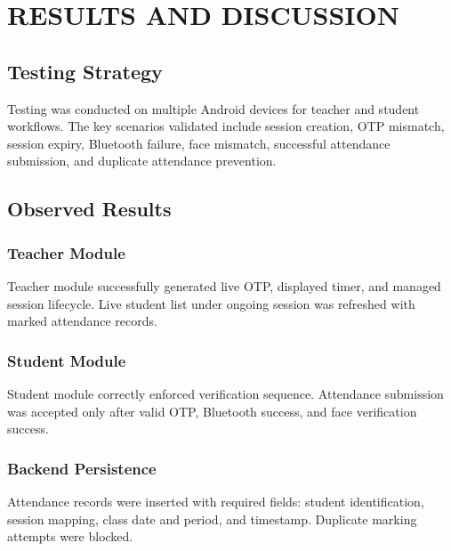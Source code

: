 \chapter{RESULTS AND DISCUSSION} \label{c6}
\section{Testing Strategy}
Testing was conducted on multiple Android devices for teacher and student workflows. The key scenarios validated include session creation, OTP mismatch, session expiry, Bluetooth failure, face mismatch, successful attendance submission, and duplicate attendance prevention.

\section{Observed Results}
\subsection{Teacher Module}
Teacher module successfully generated live OTP, displayed timer, and managed session lifecycle. Live student list under ongoing session was refreshed with marked attendance records.

\subsection{Student Module}
Student module correctly enforced verification sequence. Attendance submission was accepted only after valid OTP, Bluetooth success, and face verification success.

\subsection{Backend Persistence}
Attendance records were inserted with required fields: student identification, session mapping, class date and period, and timestamp. Duplicate marking attempts were blocked.

